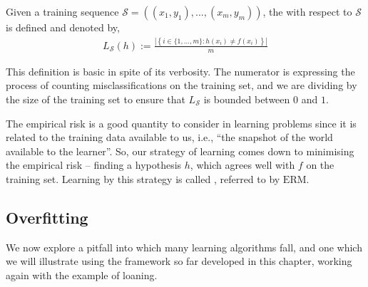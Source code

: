 \begin{definition}
	Given a training sequence $ \mathcal{S} = ( ( x_{1}, y_{1} ), ..., ( x_{m}, y_{m} ) ) $, the  with respect to $ \mathcal{S} $ is defined and denoted by,
	\begin{align*}
		L_{\mathcal{S}}( h ) := \frac{|\left\{ i \in \{ 1,...,m \}: h ( x_{i} ) \neq f ( x_{i} ) \right\}|}{m}
	\end{align*}
\end{definition}

This definition is basic in spite of its verbosity. The numerator is expressing the process of counting misclassifications on the training set, and we are dividing by the size of the training set to ensure that $ L_{\mathcal{S}} $ is bounded between $ 0 $ and $ 1 $.

The empirical risk is a good quantity to consider in learning problems since it is related to the training data available to us, i.e., ``the snapshot of the world available to the learner''\cite{schwartz}. So, our strategy of learning comes down to minimising the empirical risk -- finding a hypothesis $ h $, which agrees well with $ f $ on the training set. Learning by this strategy is called , referred to by $ \mathrm{ERM} $.

\subsection{Overfitting}
We now explore a pitfall into which many learning algorithms fall, and one which we will illustrate using the framework so far developed in this chapter, working again with the example of loaning.

